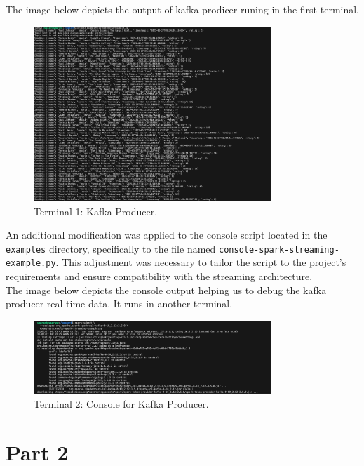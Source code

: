 \documentclass[a4paper,11pt]{article}
\theoremstyle{mytheor}
\begin{document}
The image below depicts the output of kafka prodicer runing in the first terminal. 

\begin{figure}[h!]
    \centering
    \includegraphics[width=0.8\textwidth]{1-kafka-data.png} %
    \caption{Terminal 1: Kafka Producer.}
    \label{fig:cassandra-sample}
\end{figure}


An additional modification was applied to the console script located in the \texttt{examples} directory, specifically to the file named \texttt{console-spark-streaming-example.py}. This adjustment was necessary to tailor the script to the project’s requirements and ensure compatibility with the streaming architecture.\\

The image below depicts the console output helping us to debug the kafka producer real-time data. It runs in another terminal. 

\begin{figure}[h!]
    \centering
    \includegraphics[width=0.8\textwidth]{2-console-debug-kafka.png} %
    \caption{Terminal 2: Console for Kafka Producer.}
    \label{fig:cassandra-sample}
\end{figure}

\section*{Part 2}
\end{document}

